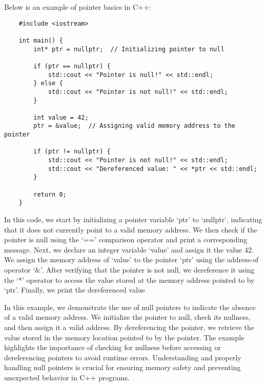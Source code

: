 \begin{solution}
    Below is an example of pointer basics in C++:
    

    \horizontalline
    
    \begin{verbatim}   
    #include <iostream>

    int main() {
        int* ptr = nullptr;  // Initializing pointer to null
    
        if (ptr == nullptr) {
            std::cout << "Pointer is null!" << std::endl;
        } else {
            std::cout << "Pointer is not null!" << std::endl;
        }
    
        int value = 42;
        ptr = &value;  // Assigning valid memory address to the pointer
    
        if (ptr != nullptr) {
            std::cout << "Pointer is not null!" << std::endl;
            std::cout << "Dereferenced value: " << *ptr << std::endl;
        }
    
        return 0;
    }
        \end{verbatim}
    
        \horizontalline

    In this code, we start by initializing a pointer variable `ptr' to `nullptr', indicating that it does not currently point to a valid memory address. We then check if the pointer is null using the `==' comparison operator and print a 
    corresponding message. Next, we declare an integer variable `value' and assign it the value 42. We assign the memory address of `value' to the pointer `ptr' using the address-of operator `\&'. After verifying that the pointer is not 
    null, we dereference it using the `*' operator to access the value stored at the memory address pointed to by `ptr'. Finally, we print the dereferenced value

    In this example, we demonstrate the use of null pointers to indicate the absence of a valid memory address. We initialize the pointer to null, check its nullness, and then assign it a valid address. By dereferencing the pointer, we 
    retrieve the value stored in the memory location pointed to by the pointer. The example highlights the importance of checking for nullness before accessing or dereferencing pointers to avoid runtime errors. Understanding and properly 
    handling null pointers is crucial for ensuring memory safety and preventing unexpected behavior in C++ programs.
\end{solution}

